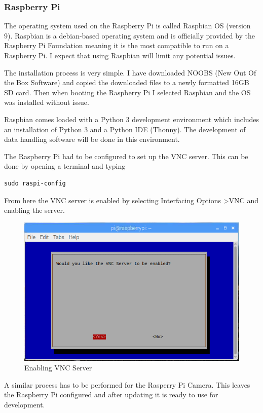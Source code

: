 \documentclass[10pt,a4paper]{article}
\begin{document}
\subsubsection{Raspberry Pi}
The operating system used on the Raspberry Pi is called Raspbian OS (version 9). Raspbian is a debian-based operating system and is officially provided by the Raspberry Pi Foundation meaning it is the most compatible to run on a Raspberry Pi. I expect that using Raspbian will limit any potential issues. 

The installation process is very simple. I have downloaded NOOBS (New Out Of the Box Software) and copied the downloaded files to a newly formatted 16GB SD card. Then when booting the Raspberry Pi I selected Raspbian and the OS was installed without issue. 

Raspbian comes loaded with a Python 3 development environment which includes an installation of Python 3 and a Python IDE (Thonny). The development of data handling software will be done in this environment. 

The Raspberry Pi had to be configured to set up the VNC server. This can be done by opening a terminal and typing \begin{verbatim}
sudo raspi-config
\end{verbatim} From here the VNC server is enabled by selecting Interfacing Options \textgreater VNC and enabling the server.

\begin{figure}[H]
\centering
  \includegraphics[width=\linewidth]{images/vncserver.png}
  \caption{Enabling VNC Server}
  \label{fig:vncserver}
\end{figure}

A similar process has to be performed for the Rasperry Pi Camera. This leaves the Raspberry Pi configured and after updating it is ready to use for development.
\end{document}
